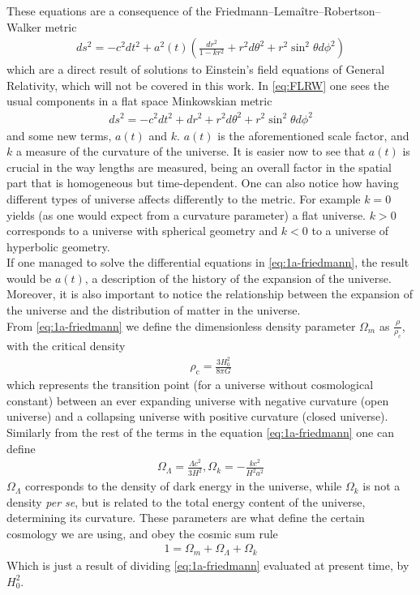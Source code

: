 These equations are a consequence of the Friedmann–Lemaître–Robertson–Walker metric \cite{cosmology}
\begin{align}
	ds ^2 = -c^2 dt^2  + a^2(t) \left( \frac{dr^2}{1-kr^2} +r^2d\theta ^2 + r^2 \sin^2\theta d\phi^2\right) 
	\label{eq:FLRW}
\end{align}which are a direct result of solutions to Einstein's field equations of General Relativity, which will not be covered in this work. In \eqref{eq:FLRW} one sees the usual components in a flat space Minkowskian metric 
\begin{align}
	ds^2 = -c^2dt^2 + dr^2 + r^2d\theta^2 + r^2 \sin^2\theta d\phi^2
\end{align} and some new terms, $a(t)$ and $k$. $a(t)$ is the aforementioned scale factor, and $k$ a measure of the curvature of the universe. It is easier now to see that $a(t)$ is crucial in the way lengths are measured, being an overall factor in the spatial part that is homogeneous but time-dependent. One can also notice how having different types of universe affects differently to the metric. For example $k=0$ yields (as one would expect from a curvature parameter) a flat universe. $k>0$ corresponds to a universe with spherical geometry and $k<0$ to a universe of hyperbolic geometry. \\

If one managed to solve the differential equations in \eqref{eq:1a-friedmann}, the result would be $a(t)$, a description of the history of the expansion of the universe. Moreover, it is also important to notice the relationship between the expansion of the universe and the distribution of matter in the universe. \\

From \eqref{eq:1a-friedmann} we define the dimensionless density parameter $\Omega_m$ as $\frac{\rho}{\rho_{\text{c}}}$, with the critical density 
\begin{align}
	\rho_{\text{c}} = \frac{3H_0^2}{8\pi G}
\end{align} which represents the transition point (for a universe without cosmological constant) between an ever expanding universe with negative curvature (open universe) and a collapsing universe with positive curvature (closed universe). Similarly from the rest of the terms in the equation \eqref{eq:1a-friedmann} one can define
\begin{align}
 \Omega_\Lambda = \frac{\Lambda c^2}{3H^2}, \Omega_k = -\frac{kc^2}{H^2a^2} 
 \label{eq:definitions}
\end{align}
$\Omega_\Lambda$ corresponds to the density of dark energy in the universe, while $\Omega_k$ is not a density \textit{per se}, but is related to the total energy content of the universe, determining its curvature.
These parameters are what define the certain cosmology we are using, and obey the cosmic sum rule 
\begin{align}
	1 = \Omega_m + \Omega_\Lambda + \Omega_k
	\label{eq:cosmic-sum-rule}
\end{align}
Which is just a result of dividing \eqref{eq:1a-friedmann} evaluated at present time, by  $H_0^2$. \\

